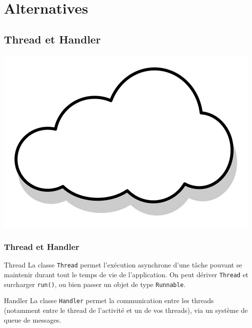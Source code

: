 \documentclass{beamer}
\begin{document}
\section{Alternatives}
\subsection{Thread et Handler}

\begin{frame}
\begin{center}
\includegraphics[scale=0.2]{thread.jpg}
\end{center}
\frametitle{Thread et Handler}

\begin{block}{Thread}
La classe \verb!Thread! permet l'exécution asynchrone d'une tâche pouvant se maintenir durant tout le temps de vie de l'application.
On peut dériver \verb!Thread! et surcharger \verb!run()!, ou bien passer un objet de type \verb!Runnable!.
\end{block}

\begin{block}{Handler}
La classe \verb!Handler! permet la communication entre les threads (notamment entre le thread de l'activité et un de vos threads), via un système de queue de messages.
\end{block}

\end{frame}
\end{document}
